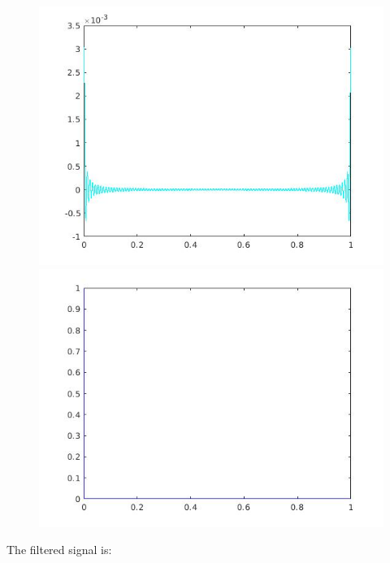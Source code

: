 \documentclass[a4paper,11pt]{article}
\begin{document}
\begin{figure}[!hp]
\centering
\begin{minipage}{.5\textwidth}
  \centering
  \includegraphics[width=1\linewidth]{images/lab1_5.jpg}
\end{minipage}%
\begin{minipage}{.5\textwidth}
  \centering
  \includegraphics[width=1\linewidth]{images/lab1_4.jpg}
\end{minipage}
\end{figure}

The filtered signal is:
\end{document}
